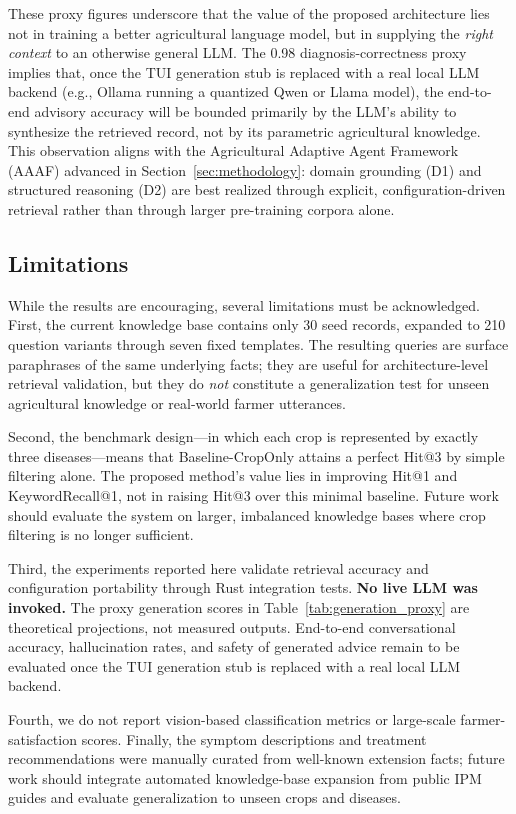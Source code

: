\documentclass[11pt,a4paper]{article}
\begin{document}
These proxy figures underscore that the value of the proposed architecture lies not in training a better agricultural language model, but in supplying the \textit{right context} to an otherwise general LLM. The 0.98 diagnosis-correctness proxy implies that, once the TUI generation stub is replaced with a real local LLM backend (e.g., Ollama running a quantized Qwen or Llama model), the end-to-end advisory accuracy will be bounded primarily by the LLM's ability to synthesize the retrieved record, not by its parametric agricultural knowledge. This observation aligns with the Agricultural Adaptive Agent Framework (AAAF) advanced in Section~\ref{sec:methodology}: domain grounding (D1) and structured reasoning (D2) are best realized through explicit, configuration-driven retrieval rather than through larger pre-training corpora alone.

\subsection{Limitations}

While the results are encouraging, several limitations must be acknowledged. First, the current knowledge base contains only 30 seed records, expanded to 210 question variants through seven fixed templates. The resulting queries are surface paraphrases of the same underlying facts; they are useful for architecture-level retrieval validation, but they do \textit{not} constitute a generalization test for unseen agricultural knowledge or real-world farmer utterances.

Second, the benchmark design---in which each crop is represented by exactly three diseases---means that Baseline-CropOnly attains a perfect Hit@3 by simple filtering alone. The proposed method's value lies in improving Hit@1 and KeywordRecall@1, not in raising Hit@3 over this minimal baseline. Future work should evaluate the system on larger, imbalanced knowledge bases where crop filtering is no longer sufficient.

Third, the experiments reported here validate retrieval accuracy and configuration portability through Rust integration tests. \textbf{No live LLM was invoked.} The proxy generation scores in Table~\ref{tab:generation_proxy} are theoretical projections, not measured outputs. End-to-end conversational accuracy, hallucination rates, and safety of generated advice remain to be evaluated once the TUI generation stub is replaced with a real local LLM backend.

Fourth, we do not report vision-based classification metrics or large-scale farmer-satisfaction scores. Finally, the symptom descriptions and treatment recommendations were manually curated from well-known extension facts; future work should integrate automated knowledge-base expansion from public IPM guides and evaluate generalization to unseen crops and diseases.
\end{document}
